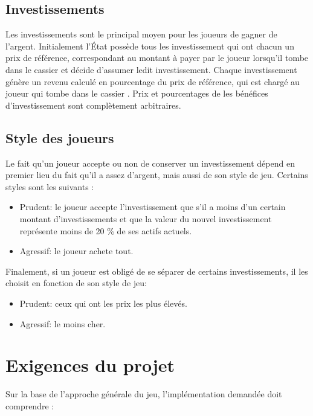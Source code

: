 \documentclass[12pt]{article}
\begin{document}
    \subsection{Investissements}
Les investissements sont le principal moyen pour les joueurs de gagner de l'argent. Initialement
l'\'Etat possède tous les investissement qui ont chacun un prix de référence, correspondant au
montant à payer par le joueur lorsqu'il tombe dans le cassier et décide d'assumer ledit
investissement.
Chaque investissement génère un revenu calculé en pourcentage du prix de
référence, qui est chargé au joueur qui tombe dans le cassier . 
Prix et pourcentages de les bénéfices d'investissement sont complètement arbitraires.

    \subsection{Style des joueurs}

    Le fait qu'un joueur accepte ou non de conserver un investissement dépend en premier lieu 
    du fait qu'il a assez d'argent, mais aussi de son style de jeu. 
    Certains styles sont les suivants :
        \begin{itemize}
           \item Prudent: le joueur accepte l'investissement que s'il a moins d'un certain montant 
           d'investissements et que la valeur du nouvel investissement représente moins de 20 \% de ses
           actifs actuels.
           \item  Agressif: le joueur achete tout.
        \end{itemize}

    Finalement, si un joueur est obligé de se séparer de certains investissements, 
        il les choisit en fonction de son style de jeu:
        \begin{itemize}
            \item Prudent: ceux qui ont les prix les plus élevés.
            \item Agressif: le moins cher.
        \end{itemize}


        
\section{Exigences du projet}
Sur la base de l'approche générale du jeu, 
l'implémentation demandée doit comprendre :
\end{document}
